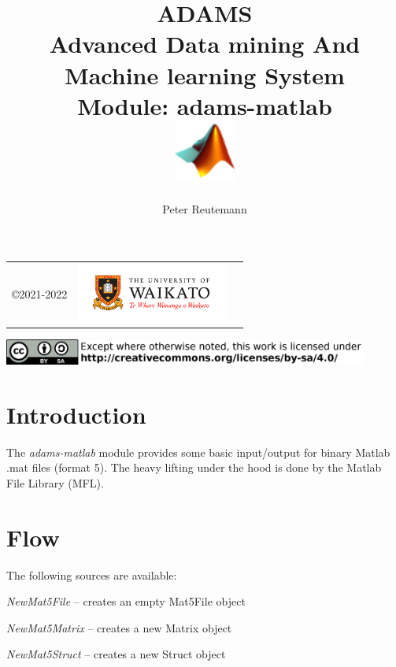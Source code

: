 \documentclass[a4paper]{book}
\title{
  \textbf{ADAMS} \\
  {\Large \textbf{A}dvanced \textbf{D}ata mining \textbf{A}nd \textbf{M}achine
  learning \textbf{S}ystem} \\
  {\Large Module: adams-matlab} \\
  \vspace{1cm}
  \includegraphics[width=2cm]{images/matlab-module.png} \\
}
\author{
  Peter Reutemann
}
\begin{document}
\begin{titlepage}
\maketitle

\thispagestyle{empty}
\center
\begin{table}[b]
	\begin{tabular}{c l l}
		\parbox[c][2cm]{2cm}{\copyright 2021-2022} &
		\parbox[c][2cm]{5cm}{\includegraphics[width=5cm]{images/coat_of_arms.pdf}} \\
	\end{tabular}
	\includegraphics[width=12cm]{images/cc.png} \\
\end{table}

\end{titlepage}

\tableofcontents

\chapter{Introduction}
The \textit{adams-matlab} module provides some basic input/output for binary
Matlab .mat files (format 5). The heavy lifting under the hood is done
by the Matlab File Library (MFL)\cite{mfl}.


\chapter{Flow}
The following sources are available:
\begin{tight_itemize}
  \item \textit{NewMat5File} -- creates an empty Mat5File object
  \item \textit{NewMat5Matrix} -- creates a new Matrix object
  \item \textit{NewMat5Struct} -- creates a new Struct object
\end{tight_itemize}
\end{document}
